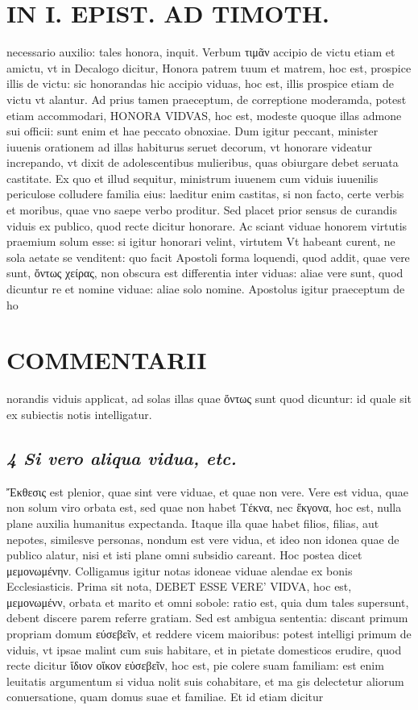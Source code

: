 \documentclass{article}
\begin{document}
\begin{pages}
\section*{IN I. EPIST. AD TIMOTH. }
\marginpar{[ p.121 ]}\pstart necessario auxilio: tales honora, inquit. Verbum τιμᾶν accipio de victu etiam et amictu, vt in Decalogo dicitur, Honora patrem tuum et matrem, hoc est, prospice illis de victu: sic honorandas hic accipio viduas, hoc est, illis prospice etiam de victu vt alantur. Ad prius tamen praeceptum, de correptione moderamda, potest etiam accommodari, HONORA VIDVAS, hoc est, modeste quoque illas admone sui officii: sunt enim et hae peccato obnoxiae. Dum igitur peccant, minister iuuenis orationem ad illas habiturus seruet decorum, vt honorare videatur increpando, vt dixit de adolescentibus mulieribus, quas obiurgare debet seruata castitate. Ex quo et illud sequitur, ministrum iuuenem cum viduis iuuenilis periculose colludere familia eius: laeditur enim castitas, si non facto, certe verbis et moribus, quae vno saepe verbo proditur.  \pend\pstart Sed placet prior sensus de curandis viduis ex publico, quod recte dicitur honorare. Ac sciant viduae honorem virtutis praemium solum esse: si igitur honorari velint, virtutem Vt habeant curent, ne sola aetate se venditent: quo facit Apostoli forma loquendi, quod addit, quae vere sunt, ὄντως χείρας, non obscura est differentia inter viduas: aliae vere sunt, quod dicuntur re et nomine viduae: aliae solo nomine. Apostolus igitur praeceptum de ho\pend
\section*{COMMENTARII }
\marginpar{[ p.122 ]}\pstart norandis viduis applicat, ad solas illas quae ὄντως sunt quod dicuntur: id quale sit ex subiectis notis intelligatur.  \pend
{}
{}
\subsection*{\textit{4 Si vero aliqua vidua, etc. }}\pstart Ἔκθεσις est plenior, quae sint vere viduae, et quae non vere. Vere est vidua, quae non solum viro orbata est, sed quae non habet Τέκνα, nec ἔκγονα, hoc est, nulla plane auxilia humanitus expectanda.  \pend\pstart Itaque illa quae habet filios, filias, aut nepotes, similesve personas, nondum est vere vidua, et ideo non idonea quae de publico alatur, nisi et isti plane omni subsidio careant. Hoc postea dicet μεμονωμένην. Colligamus igitur notas idoneae viduae alendae ex bonis Ecclesiasticis. Prima sit nota, DEBET ESSE VERE' VIDVA, hoc est, μεμονωμένν, orbata et marito et omni sobole: ratio est, quia dum tales supersunt, debent discere parem referre gratiam. Sed est ambigua sententia: discant primum propriam domum εύσεβεῖν, et reddere vicem maioribus: potest intelligi primum de viduis, vt ipsae malint cum suis habitare, et in pietate domesticos erudire, quod recte dicitur ἴδιον οἴκον εὐσεβεῖν, hoc est, pie colere suam familiam: est enim leuitatis argumentum si vidua nolit suis cohabitare, et ma gis delectetur aliorum conuersatione, quam domus suae et familiae. Et id etiam dicitur  \pend

\end{pages}
\end{document}
